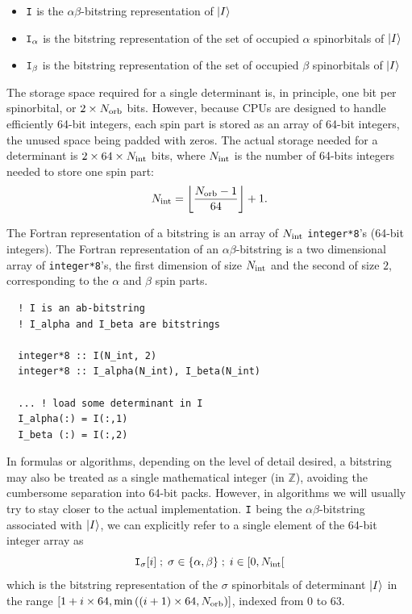 \documentclass[./thesis.tex]{subfiles}
\begin{document}
\begin{itemize}
\item
${\texttt{I}}$ is the $\alpha \beta$-bitstring representation of ${\ket{I}}$
\item
${\texttt{I}}_\alpha$ is the bitstring representation of the set of occupied $\alpha$ spinorbitals of ${\ket{I}}$ 
\item
${\texttt{I}}_\beta$ is the bitstring representation of the set of occupied $\beta$ spinorbitals of ${\ket{I}}$ 

\end{itemize}


The storage space required for a single determinant is, in principle, one bit per spinorbital, or $2 \times {N_\text{orb}}$ bits. However, because CPUs are designed to handle efficiently 64-bit integers, each spin part is stored as an array of 64-bit integers, the unused space being padded with zeros. 
The actual storage needed for a determinant is $2 \times 64 \times {N_\text{int}}$ bits, where ${N_\text{int}}$ is the number of 64-bits integers needed to store one spin part:
\begin{equation}
{N_\text{int}} = \left \lfloor \frac{{N_\text{orb}}-1}{64} \right \rfloor + 1.
\end{equation}


The Fortran representation of a bitstring is an array of ${N_\text{int}}$ \lstinline{integer*8}'s (64-bit integers).  
The Fortran representation of an $\alpha \beta$-bitstring is a two dimensional array of \lstinline{integer*8}'s, the first dimension of size ${N_\text{int}}$ and the second of size $2$, corresponding to the $\alpha$ and $\beta$ spin parts.


\lstset{frame=single}
\begin{lstlisting}
  ! I is an ab-bitstring
  ! I_alpha and I_beta are bitstrings
  
  integer*8 :: I(N_int, 2)
  integer*8 :: I_alpha(N_int), I_beta(N_int)

  ... ! load some determinant in I
  I_alpha(:) = I(:,1)
  I_beta (:) = I(:,2)
\end{lstlisting}
\lstset{frame=none}


In formulas or algorithms, depending on the level of detail desired, a bitstring may also be treated as a single mathematical integer (in $\mathbb{Z}$), avoiding the cumbersome separation into 64-bit packs. However, in algorithms we will usually try to stay closer to the actual implementation. ${\texttt{I}}$ being the $\alpha \beta$-bitstring associated with ${\ket{I}}$, we can explicitly refer to a single element of the 64-bit integer array as
\begin{equation}
{\texttt{I}}_{\sigma}[i]\; ;\; \sigma \in \{\alpha, \beta\}\; ;\; i \in [0, {N_\text{int}}[
\end{equation}
which is the bitstring representation of the $\sigma$ spinorbitals of determinant ${\ket{I}}$ in the range $[1+i \times 64, \min \left( (i+1) \times 64, {N_\text{orb}} \right)]$, indexed from $0$ to $63$.
\end{document}
